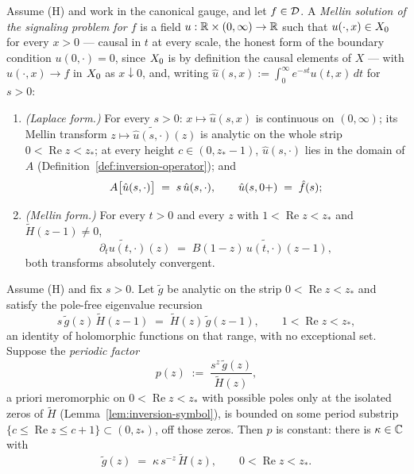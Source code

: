 \begin{definition}\label{def:mellin-solution}
Assume (H) and work in the canonical gauge, and let $f \in \mathcal{D}$. A \emph{Mellin solution of the
signaling problem for $f$} is a field $u : \mathbb{R} \times (0,\infty) \to \mathbb{R}$ such that $u(\cdot, x)
\in X_0$ for every $x > 0$ --- causal in $t$ at every scale, the honest form of the boundary
condition $u(0,\cdot) = 0$, since $X_0$ is by definition the causal elements of $X$ --- with
$u(\cdot, x) \to f$ in $X_0$ as $x \downarrow 0$, and, writing
$\hat u(s,x) := \int_0^\infty e^{-st}u(t,x)\,dt$ for $s > 0$:
\begin{enumerate}
\item \emph{(Laplace form.)} For every $s > 0$: $x \mapsto \hat u(s,x)$ is continuous on
$(0,\infty)$; its Mellin transform $z \mapsto \widetilde{\hat u(s,\cdot)}(z)$ is analytic on the
whole strip $0 < \operatorname{Re} z < z_*$; at every height $c \in (0, z_*-1)$, $\hat u(s,\cdot)$ lies in the
domain of $A$ (Definition~\ref{def:inversion-operator}); and
\[
A\bigl[\hat u(s,\cdot)\bigr] \;=\; s\,\hat u(s,\cdot), \qquad \hat u(s, 0{+}) \;=\; \hat f(s);
\]
\item \emph{(Mellin form.)} For every $t > 0$ and every $z$ with $1 < \operatorname{Re} z < z_*$ and
$\tilde H(z-1) \ne 0$,
\[
\widetilde{\partial_t u(t, \cdot)}(z) \;=\; B(1-z)\,\widetilde{u(t,\cdot)}(z-1),
\]
both transforms absolutely convergent.
\end{enumerate}
\end{definition}

\begin{lemma}\label{lem:mode-rigidity}
Assume (H) and fix $s > 0$. Let $\tilde g$ be analytic on the strip $0 < \operatorname{Re} z < z_*$ and satisfy
the pole-free eigenvalue recursion
\[
s\,\tilde g(z)\,\tilde H(z-1) \;=\; \tilde H(z)\,\tilde g(z-1), \qquad 1 < \operatorname{Re} z < z_*,
\]
an identity of holomorphic functions on that range, with no exceptional set. Suppose the
\emph{periodic factor}
\[
p(z) \;:=\; \frac{s^z\,\tilde g(z)}{\tilde H(z)},
\]
a priori meromorphic on $0 < \operatorname{Re} z < z_*$ with possible poles only at the isolated zeros of
$\tilde H$ (Lemma~\ref{lem:inversion-symbol}), is bounded on some period substrip
$\{c \le \operatorname{Re} z \le c+1\} \subset (0, z_*)$, off those zeros. Then $p$ is constant: there is
$\kappa \in \mathbb{C}$ with
\[
\tilde g(z) \;=\; \kappa\, s^{-z}\,\tilde H(z), \qquad 0 < \operatorname{Re} z < z_*.
\]
\end{lemma}

